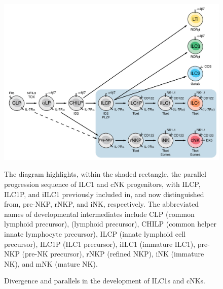 \begin{figure}[p]
\begin{center}
	\includegraphics[width=\textwidth]{figures/chapter2/S2}
\end{center}
	\caption{Divergence and parallels in the development of ILC1s and cNKs.} 
	 The diagram highlights, within the shaded rectangle, the parallel progression sequence of ILC1 and cNK progenitors, with ILCP, ILC1P, and iILC1 previously included in, and now distinguished from, pre-NKP, rNKP, and iNK, respectively. The abbreviated names of developmental intermediates include CLP (common lymphoid precursor), \aLP (\ab\UP lymphoid precursor), CHILP (common helper innate lymphocyte precursor), ILCP (innate lymphoid cell precursor), ILC1P (ILC1 precursor), iILC1 (immature ILC1), pre-NKP (pre-NK precursor), rNKP (refined NKP), iNK (immature NK), and mNK (mature NK).
	\label{fig:chap2_S2}
\end{figure}

\renewcommand\thefigure{\thechapter.\arabic{figure}} 


